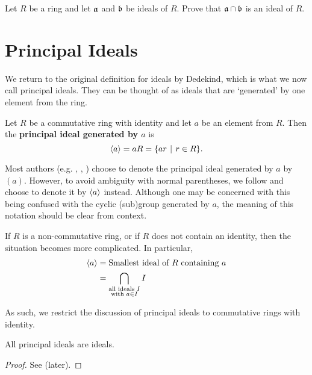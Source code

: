 \begin{exercise}
    Let $R$ be a ring and let $\mathfrak{a}$ and $\mathfrak{b}$ be ideals of $R$. Prove that $\mathfrak{a} \cap \mathfrak{b}$ is an ideal of $R$.
\end{exercise}

\section{Principal Ideals}
We return to the original definition for ideals by Dedekind, which is what we now call principal ideals. They can be thought of as ideals that are `generated' by one element from the ring.
\begin{definition}
    Let $R$ be a commutative ring with identity and let $a$ be an element from $R$. Then the \textbf{principal ideal generated by $a$} is
    \[
        \princ{a} = aR = \{ar \vert r \in R\}.
    \]
\end{definition}
\begin{remark}
    Most authors (e.g. \cite[p.~123, Definition III.2.4]{hungerford_1980}, \cite[\S 158]{clark_1984}, \cite[p.~251]{dummit_foote_2004}) choose to denote the principal ideal generated by $a$ by $(a)$. However, to avoid ambiguity with normal parentheses, we follow \cite[p.~250, Example 3]{gallian_2016} and choose to denote it by $\left\langle a\right\rangle$ instead. Although one may be concerned with this being confused with the cyclic (sub)group generated by $a$, the meaning of this notation should be clear from context.
\end{remark}
\begin{remark}
    If $R$ is a non-commutative ring, or if $R$ does not contain an identity, then the situation becomes more complicated. In particular,
    \begin{align*}
        \left\langle a\right\rangle &= \text{Smallest ideal of } R \text{ containing }a\\
        &= \bigcap_{\substack{\text{all ideals }I \\ \text{with } a \in I}}I
    \end{align*}

    As such, we restrict the discussion of principal ideals to commutative rings with identity.
\end{remark}

\begin{proposition}
    All principal ideals are ideals.
\end{proposition}
\begin{proof}
    See  (later).
\end{proof}

